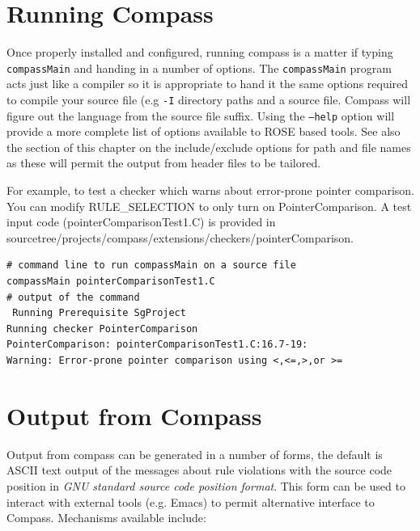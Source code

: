 \section{Running Compass}

Once properly installed and configured, running compass is a matter if typing {\tt compassMain} 
and handing in a number of options. The {\tt compassMain} program acts just 
like a compiler so it is appropriate to hand it the same options required to 
compile your source file (e.g {\tt -I} directory paths and a source file.  
Compass will figure out the language from the source file suffix.  
Using the {\tt --help} option will provide a more complete list of options 
available to ROSE based tools.  See also the section of this chapter on the 
include/exclude options for path and file names as these will permit the 
output from header files to be tailored.

For example, to test a checker which warns about error-prone pointer
comparison. You can modify RULE\_SELECTION to only turn on
PointerComparison. A test input code (pointerComparisonTest1.C) is provided
in sourcetree/projects/compass/extensions/checkers/pointerComparison. 
\begin{verbatim}
# command line to run compassMain on a source file
compassMain pointerComparisonTest1.C
# output of the command
 Running Prerequisite SgProject
Running checker PointerComparison
PointerComparison: pointerComparisonTest1.C:16.7-19: 
Warning: Error-prone pointer comparison using <,<=,>,or >=
\end{verbatim}

\section{Output from Compass}

   Output from compass can be generated in a number of forms, the default is
ASCII text output of the messages about rule violations with the source code
position in {\it GNU standard source code position format}.  This form can be
used to interact with external tools (e.g. Emacs) to permit alternative
interface to Compass.  Mechanisms available include:

